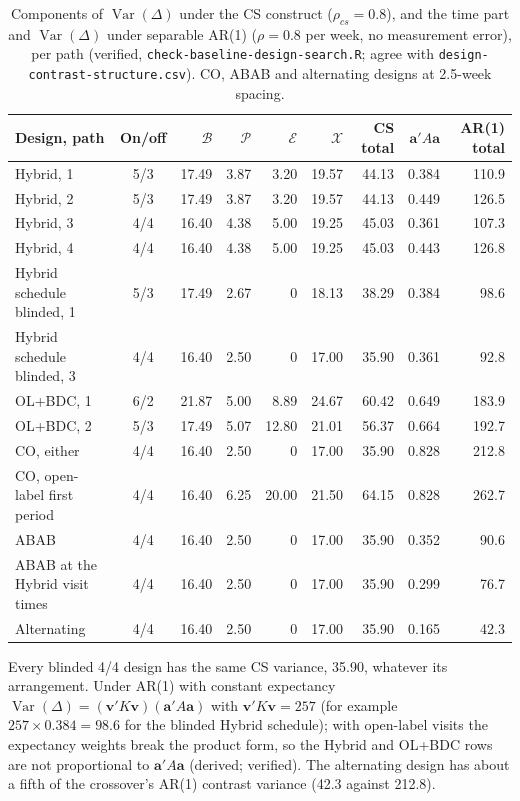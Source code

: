 \documentclass[11pt]{article}
\newcommand{\code}[1]{\texttt{#1}}
\begin{document}
\begin{table}[h]
\centering\small
\caption{Components of $\operatorname{Var}(\Delta)$ under the CS
construct ($\rho_{cs} = 0.8$), and the time part and $\operatorname{Var}(\Delta)$
under separable AR(1) ($\rho = 0.8$ per week, no measurement error), per
path (verified, \code{check-baseline-design-search.R}; agree with
\code{design-contrast-structure.csv}). CO, ABAB and alternating designs
at 2.5-week spacing.}
\label{tab:invf-parts}
\footnotesize\setlength{\tabcolsep}{4pt}
\begin{tabular}{@{}lcrrrrrrr@{}}
\toprule
Design, path & On/off & $\mathcal B$ & $\mathcal P$ & $\mathcal E$ &
  $\mathcal X$ & CS total & $\mathbf a'A\mathbf a$ & AR(1) total \\
\midrule
Hybrid, 1 & 5/3 & 17.49 & 3.87 & 3.20 & 19.57 & 44.13 & 0.384 & 110.9 \\
Hybrid, 2 & 5/3 & 17.49 & 3.87 & 3.20 & 19.57 & 44.13 & 0.449 & 126.5 \\
Hybrid, 3 & 4/4 & 16.40 & 4.38 & 5.00 & 19.25 & 45.03 & 0.361 & 107.3 \\
Hybrid, 4 & 4/4 & 16.40 & 4.38 & 5.00 & 19.25 & 45.03 & 0.443 & 126.8 \\
Hybrid schedule blinded, 1 & 5/3 & 17.49 & 2.67 & 0 & 18.13 & 38.29 & 0.384 & 98.6 \\
Hybrid schedule blinded, 3 & 4/4 & 16.40 & 2.50 & 0 & 17.00 & 35.90 & 0.361 & 92.8 \\
OL+BDC, 1 & 6/2 & 21.87 & 5.00 & 8.89 & 24.67 & 60.42 & 0.649 & 183.9 \\
OL+BDC, 2 & 5/3 & 17.49 & 5.07 & 12.80 & 21.01 & 56.37 & 0.664 & 192.7 \\
CO, either & 4/4 & 16.40 & 2.50 & 0 & 17.00 & 35.90 & 0.828 & 212.8 \\
CO, open-label first period & 4/4 & 16.40 & 6.25 & 20.00 & 21.50 & 64.15 & 0.828 & 262.7 \\
ABAB & 4/4 & 16.40 & 2.50 & 0 & 17.00 & 35.90 & 0.352 & 90.6 \\
ABAB at the Hybrid visit times & 4/4 & 16.40 & 2.50 & 0 & 17.00 & 35.90 & 0.299 & 76.7 \\
Alternating & 4/4 & 16.40 & 2.50 & 0 & 17.00 & 35.90 & 0.165 & 42.3 \\
\bottomrule
\end{tabular}
\end{table}

\noindent Every blinded 4/4 design has the same CS variance, 35.90,
whatever its arrangement. Under AR(1) with constant expectancy
$\operatorname{Var}(\Delta) = (\mathbf v'K\mathbf v)(\mathbf a'A\mathbf a)$
with $\mathbf v'K\mathbf v = 257$ (for example $257 \times 0.384 = 98.6$
for the blinded Hybrid schedule); with open-label visits the expectancy
weights break the product form, so the Hybrid and OL+BDC rows are not
proportional to $\mathbf a'A\mathbf a$ (derived; verified). The
alternating design has about a fifth of the crossover's AR(1) contrast
variance (42.3 against 212.8).
\end{document}
